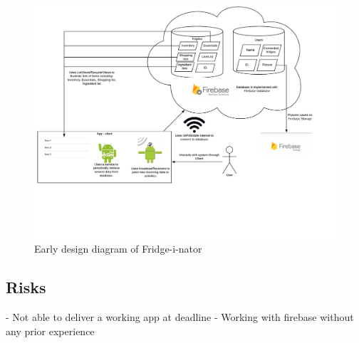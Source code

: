\begin{figure}[H]
	\centering
	\includegraphics[width=180mm]{Img/Fridge_some_diagram.pdf}
	\caption{Early design diagram of Fridge-i-nator}
	\label{fig:Design diagram}
\end{figure}

\subsection{Risks}

- Not able to deliver a working app at deadline
\newline
- Working with firebase without any prior experience

